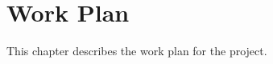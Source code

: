 %
%
\chapter{Work Plan}\label{chap:work-plan}

This chapter describes the work plan for the project.